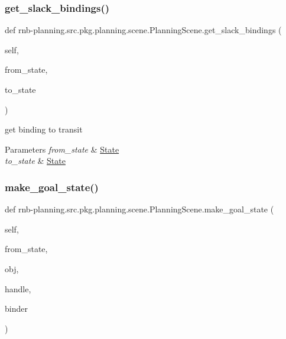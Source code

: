 \subsubsection{\texorpdfstring{get\+\_\+slack\+\_\+bindings()}{get\_slack\_bindings()}}
{\footnotesize\ttfamily def rnb-\/planning.\+src.\+pkg.\+planning.\+scene.\+Planning\+Scene.\+get\+\_\+slack\+\_\+bindings (\begin{DoxyParamCaption}\item[{}]{self,  }\item[{}]{from\+\_\+state,  }\item[{}]{to\+\_\+state }\end{DoxyParamCaption})}



get binding to transit 


\begin{DoxyParams}{Parameters}
{\em from\+\_\+state} & \hyperlink{classrnb-planning_1_1src_1_1pkg_1_1planning_1_1scene_1_1_state}{State} \\
\hline
{\em to\+\_\+state} & \hyperlink{classrnb-planning_1_1src_1_1pkg_1_1planning_1_1scene_1_1_state}{State} \\
\hline
\end{DoxyParams}
\mbox{\label{classrnb-planning_1_1src_1_1pkg_1_1planning_1_1scene_1_1_planning_scene_aeb068479c191e2167f371a9f103c7b59}} 
\subsubsection{\texorpdfstring{make\+\_\+goal\+\_\+state()}{make\_goal\_state()}}
{\footnotesize\ttfamily def rnb-\/planning.\+src.\+pkg.\+planning.\+scene.\+Planning\+Scene.\+make\+\_\+goal\+\_\+state (\begin{DoxyParamCaption}\item[{}]{self,  }\item[{}]{from\+\_\+state,  }\item[{}]{obj,  }\item[{}]{handle,  }\item[{}]{binder }\end{DoxyParamCaption})}



